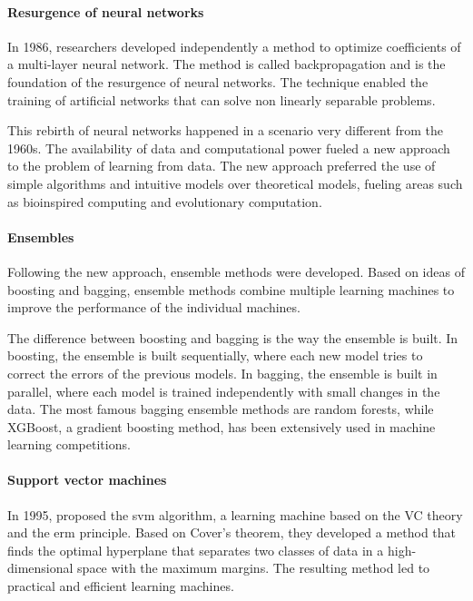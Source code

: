 \paragraph{Resurgence of neural networks}

In 1986, researchers developed independently a method to optimize coefficients of a
multi-layer neural
network.  The method is called backpropagation and
is the foundation of the resurgence of neural networks.  The technique enabled the
training of artificial networks that can solve non linearly separable problems.

This rebirth of neural networks happened in a scenario very different from the 1960s.
The availability of data and computational power fueled a new approach to the problem of
learning from data.  The new approach preferred the use of simple algorithms and
intuitive models over theoretical models, fueling areas such as bioinspired computing and
evolutionary computation.

\paragraph{Ensembles}

Following the new approach, ensemble methods were developed.  Based on ideas of
boosting and bagging, ensemble
methods combine multiple learning machines to improve the performance of the individual
machines.

The difference between boosting and bagging is the way the ensemble is built.  In
boosting, the ensemble is built sequentially, where each new model tries to correct the
errors of the previous models.  In bagging, the ensemble is built in parallel, where each
model is trained independently with small changes in the data.  The most famous bagging
ensemble methods are random forests, while XGBoost, a gradient
boosting method, has been extensively used in machine learning
competitions.

\paragraph{Support vector machines}

In 1995, \textcite{Cortes1995} proposed the \gls{svm} algorithm, a
learning machine based on the VC theory and the \gls{erm} principle.  Based on Cover's
theorem, they developed a method that finds the optimal hyperplane
that separates two classes of data in a high-dimensional space with the maximum margins.
The resulting method led to practical and efficient learning machines.

